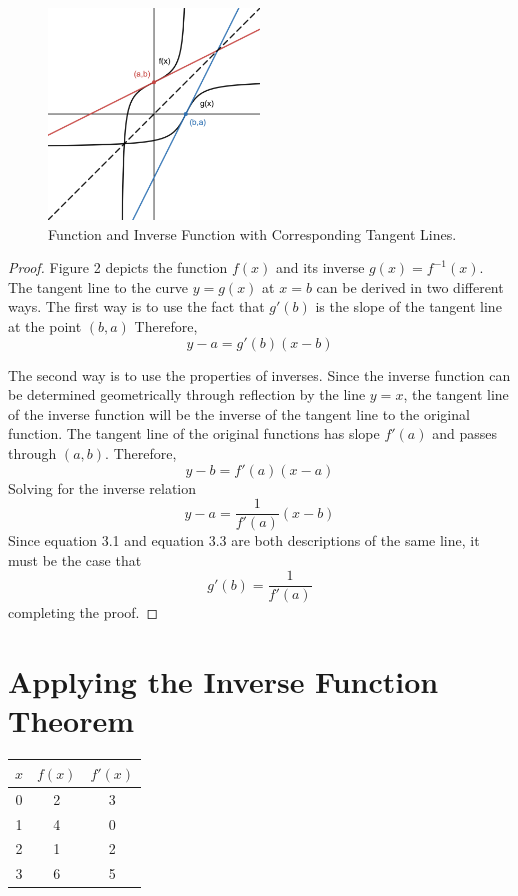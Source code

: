 \documentclass[12pt]{article}
\numberwithin{equation}{section}
\begin{document}
\begin{figure}[h]
	\centering
	\includegraphics[width=0.5\textwidth]{fig2}
	\caption{Function and Inverse Function with Corresponding Tangent Lines.}
\end{figure}
\begin{proof}
Figure 2 depicts the function $f(x)$ and its inverse $g(x) = f^{-1}(x)$. The tangent line to the curve $y = g(x)$ at $x = b$ can be derived in two different ways. The first way is to use the fact that $g'(b)$ is the slope of the tangent line at the point $(b,a)$ Therefore,
\begin{equation}
y-a = g'(b)(x-b)
\end{equation}

The second way is to use the properties of inverses. Since the inverse function can be determined geometrically through reflection by the line $y=x$, the tangent line of the inverse function will be the inverse of the tangent line to the original function. The tangent line of the original functions has slope $f'(a)$ and passes through $(a,b)$. Therefore, 
\begin{equation}
y-b = f'(a)(x-a)
\end{equation}
Solving for the inverse relation 
\begin{equation}
y-a = \frac{1}{f'(a)}(x-b)
\end{equation}
Since equation 3.1 and equation 3.3 are both descriptions of the same line, it must be the case that \[g'(b) = \frac{1}{f'(a)}\] completing the proof.
\end{proof}

\section{Applying the Inverse Function Theorem}
\begin{center}
\begin{tabular}{|c|c|c|}
\hline
$x$ & $f(x)$ & $f'(x)$ \\
\hline
0 & 2 & 3 \\
1 & 4 & 0 \\
2 & 1 & 2 \\
3 & 6 & 5 \\
\hline
\end{tabular}
\end{center}
\end{document}
